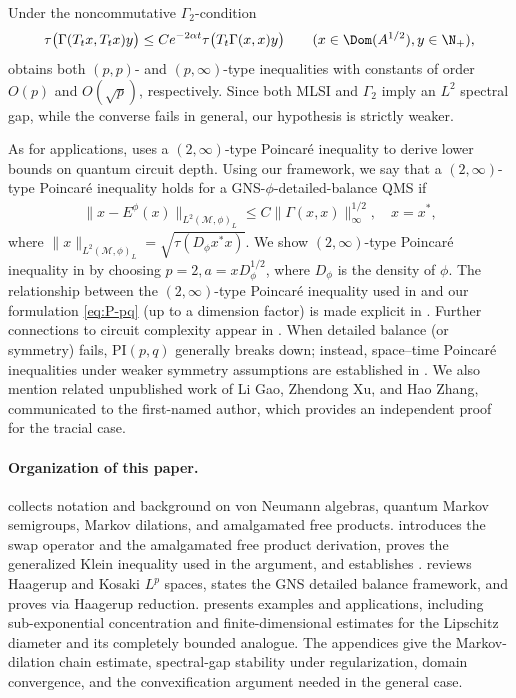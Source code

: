 \documentclass[sn-mathphys-num]{sn-jnl}
\begin{document}
Under the noncommutative $\Gamma_2$-condition
\[
  \tau\bigl(\Gamma(T_t x,T_t x) y\bigr) \le  C e^{-2\alpha t}
  \tau\bigl(T_t \Gamma(x,x) y\bigr)\qquad (x\in\Dom(A^{1/2}),  y\in\N_+),
\]
\cite{junge2015noncommutative} obtains both $(p,p)$- and $(p,\infty)$-type inequalities with constants of order $O(p)$ and $O(\sqrt{p})$, respectively.
Since both MLSI and $\Gamma_2$ imply an $L^2$ spectral gap, while the converse fails in general, our hypothesis is strictly weaker.

As for applications, \cite{De_Palma_2023} uses a $(2,\infty)$-type Poincar\'e inequality to derive lower bounds on quantum circuit depth. Using our framework, we say that a $(2,\infty)$-type Poincar\'e inequality holds for a GNS-$\phi$-detailed-balance QMS if
\begin{align*}
    \|x - E^\phi(x)\|_{L^{2}(\mathcal M,\phi)_L} \le C \|\Gamma(x,x)\|^{1/2}_\infty,\quad   x = x^*,
\end{align*}
where $\|x\|_{L^{2}(\mathcal M,\phi)_L} = \sqrt{\tau(D_\phi x^*x)}$. We show $(2,\infty)$-type Poincar\'e inequality in  by choosing $p = 2, a = x D_\phi^{1/2}$, where $D_\phi$ is the density of $\phi$. The relationship between the $(2,\infty)$-type Poincar\'e inequality used in \cite{De_Palma_2023} and our formulation \cref{eq:P-pq} (up to a dimension factor) is made explicit in \cite[(3.9), (4.16)]{Araiza2026resourcedependent}. Further connections to circuit complexity appear in \cite{Bu_2024,Li_2025,Ding_2025,araiza2025}.
When detailed balance (or symmetry) fails, $\mathrm{PI}(p,q)$ generally breaks down; instead, space--time Poincar\'e inequalities under weaker symmetry assumptions are established in \cite{li2025}.
We also mention related unpublished work of Li Gao, Zhendong Xu, and Hao Zhang,
communicated to the first-named author, which provides an independent proof for the tracial case.
\paragraph{Organization of this paper.}
 collects notation and background on von Neumann algebras, quantum Markov semigroups, Markov dilations, and amalgamated free products.
 introduces the swap operator and the amalgamated free product derivation, proves the generalized Klein inequality used in the argument, and establishes .
 reviews Haagerup and Kosaki $L^p$ spaces, states the GNS detailed balance framework, and proves  via Haagerup reduction.
 presents examples and applications, including
sub-exponential concentration and finite-dimensional estimates for the
Lipschitz diameter and its completely bounded analogue.
The appendices give the Markov-dilation chain estimate,
spectral-gap stability under regularization, domain convergence,
and the convexification argument needed in the general case.
\end{document}
